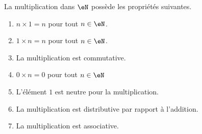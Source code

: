 \begin{proposition}     \label{PROPooGHDOooFYRmon}
	La multiplication dans \( \eN \) possède les propriétés suivantes.
	\begin{enumerate}
		\item       \label{ITEMooHFWRooDCEpjj}
		      \( n\times 1=n\) pour tout \( n\in \eN\).
		\item       \label{ITEMooRSYMooSUrRsl}
		      \( 1\times n=n\) pour tout \( n\in \eN\).
		\item       \label{ITEMooWJPOooRUYjwQ}
		      La multiplication est commutative.
		\item       \label{ITEMooNBYKooXnGRrf}
		      \( 0\times n=0\) pour tout \( n\in \eN\)
		\item      \label{ITEMooLJQBooVpUxUv}
		      L'élément \( 1\) est neutre pour la multiplication.
		\item       \label{ITEMooDYLIooETIBEL}
		      La multiplication est distributive par rapport à l'addition.
		\item       \label{ITEMooQBFSooWGDQYX}
		      La multiplication est associative.
	\end{enumerate}
\end{proposition}


